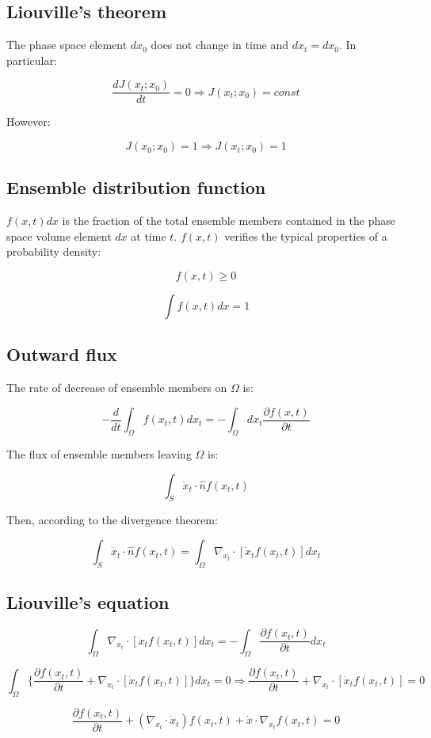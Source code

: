 	\subsection{Liouville's  theorem}
	The phase space element $dx_0$ does not change in time and $dx_t = dx_0$.
	In particular:

	$$\frac{dJ(x_t;x_0)}{dt} = 0\Rightarrow J(x_t;x_0) = const$$

	However:

	$$J(x_0;x_0) = 1\Rightarrow J(x_t;x_0) = 1$$

	\subsection{Ensemble distribution function}
	$f(x,t)dx$ is the fraction of the total ensemble members contained in the phase space volume element $dx$ at time $t$.
	$f(x,t)$ verifies the typical properties of a probability density:

	$$f(x,t) \ge 0$$

	$$\int f(x,t)dx = 1$$

	\subsection{Outward flux}
	The rate of decrease of ensemble members on $\Omega$ is:

	$$-\frac{d}{dt}\int_\Omega f(x_t, t)dx_t = -\int_\Omega dx_t\frac{\partial f(x,t)}{\partial t}$$

	The flux of ensemble members leaving $\Omega$ is:

	$$\int_S\dot{x}_t\cdot\hat{n} f(x_t,t)$$

	Then, according to the divergence theorem:

	$$\int_S\dot{x}_t\cdot\hat{n}f(x_t,t) = \int_\Omega\nabla_{x_t}\cdot[\dot{x}_tf(x_t,t)]dx_t$$

	\subsection{Liouville's equation}

	$$\int_\Omega\nabla_{x_t}\cdot[\dot{x}_tf(x_t, t)]dx_t = -\int_\Omega\frac{\partial f(x_t, t)}{\partial t}dx_t$$

	$$\int_\Omega\biggl\{\frac{\partial f(x_t, t)}{\partial t} + \nabla_{x_t}\cdot[\dot{x}_tf(x_t, t)]\biggr\}dx_t = 0\Rightarrow \frac{\partial f(x_t, t)}{\partial t} + \nabla_{x_t}\cdot[\dot{x}_tf(x_t, t)] = 0$$

	$$\frac{\partial f(x_t, t)}{\partial t} + (\nabla_{x_t}\cdot\dot{x}_t)f(x_t, t) + \dot{x}\cdot\nabla_{x_t}f(x_t, t) = 0$$

